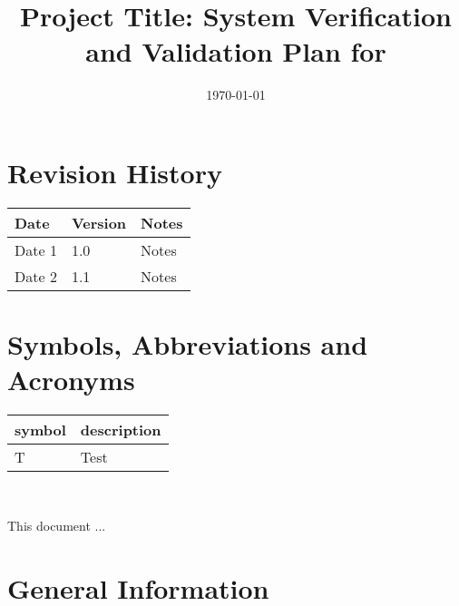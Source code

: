 \documentclass[12pt, titlepage]{article}
\begin{document}
\title{Project Title: System Verification and Validation Plan for \progname{}} 
\author{\authname}
\date{\today}
	
\maketitle


\section{Revision History}

\begin{tabularx}{\textwidth}{p{3cm}p{2cm}X}
\toprule {\bf Date} & {\bf Version} & {\bf Notes}\\
\midrule
Date 1 & 1.0 & Notes\\
Date 2 & 1.1 & Notes\\
\bottomrule
\end{tabularx}

\newpage

\tableofcontents

\listoftables
{}

\listoffigures
{}

\newpage

\section{Symbols, Abbreviations and Acronyms}

\renewcommand{\arraystretch}{1.2}
\begin{tabular}{l l} 
  \toprule		
  \textbf{symbol} & \textbf{description}\\
  \midrule 
  T & Test\\
  \bottomrule
\end{tabular}\\


\newpage


This document ... 

\section{General Information}
\end{document}
